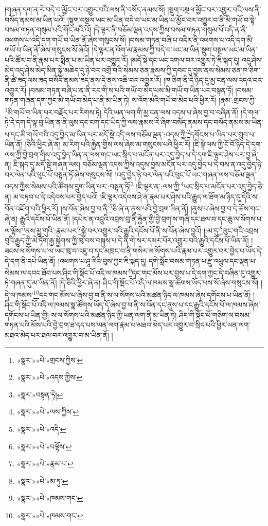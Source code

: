 །གཞན་དག་ན་རེ་བདེ་བ་མྱོང་བར་འགྱུར་བའི་ལས་ནི་བསོད་ནམས་སོ། །སྡུག་བསྔལ་མྱོང་བར་འགྱུར་བའི་ལས་ནི་བསོད་ནམས་མ་ཡིན་པའོ། །སྡུག་བསྔལ་ཡང་མ་ཡིན་བདེ་བ་ཡང་མ་ཡིན་པ་མྱོང་བར་འགྱུར་བ་ནི་མི་གཡོ་བ་སྟེ་བསམ་གཏན་གསུམ་པའི་གོང་མའི་འོ། །དེ་ལྟར་ནི་བཅོམ་ལྡན་འདས་ཀྱིས་བསམ་གཏན་གསུམ་པོ་འདི་ན་ནི་འཕགས་པ་འདི་དག་གཡོ་བ་ཡིན་ནོ་ཞེས་གསུངས་སོ། །བསམ་གཏན་བཞི་པ་འདིར་ནི་འཕགས་པ་འདི་དག་མི་གཡོ་བ་ཡིན་ནོ་ཞེས་གསུངས་སོ་ཞེའོ། །དེ་ལྟར་ན་འོག་མ་རྣམས་ཀྱི་བདེ་བ་ཡང་མ་ཡིན་སྡུག་བསྔལ་ཡང་མ་ཡིན་པའི་ཚོར་བ་ནི་རྣམ་པར་སྨིན་པ་མ་ཡིན་པར་འགྱུར་རོ། །མདོ་སྡེ་དང་ཡང་འགལ་བར་འགྱུར་ཏེ་ཇི་སྐད་དུ། འདུ་ཤེས་མེད་འདུ་ཤེས་མེད་མིན་སྐྱེ་མཆེད་དུ་ཉེ་བར་འགྲོ་བའི་སེམས་ཅན་རྣམས་ཀྱི་དབང་དུ་བྱས་ནས་སེམས་ཅན་ཁ་ཅིག་ནི་ཚེ་ཟད་ལས་ཟད་བསོད་ནམས་ཟད་ནས་དེ་ནས་འཆི་བར་འགྱུར་རོ། །ཁ་ཅིག་ནི་དེ་ཉིད་དུ་མྱ་ངན་ལས་འདའ་བར་འགྱུར་རོ། །བསམ་གཏན་བཞི་པ་ན་ནི་རང་གི་ས་པའི་གཡོ་བ་མེད་པས་མི་གཡོ་བ་ཡིན་པར་བསྟན་ཏོ། །བསམ་གཏན་གཞན་དག་ཀྱང་མི་གཡོ་བ་མེད་པ་ནི་མ་ཡིན་ཏེ། ས་འོག་མའི་གཡོ་བ་མེད་པའི་ཕྱིར་རོ། །རྣམ་:གྲངས་ཀྱི་\footnote{«སྣར་»«པེ་»གྲངས་ཀྱིས་}མི་གཡོ་བ་ཡིན་པར་བརྗོད་པར་རིགས་ཏེ། དེའི་ཡན་ལག་གི་མྱ་ངན་ལས་འདས་པ་ཞེས་བྱ་བ་བཞིན་ནོ། །དེ་གལ་ཏེ་དེ་དག་དེ་ལྟ་བུ་ཡིན་ན་ནི་ལུས་དང་ངག་དང་ཡིད་ཀྱི་ལས་རྣམས་རེ་ཞིག་བསོད་ནམས་དང་བསོད་ནམས་མ་ཡིན་པ་དང་མི་གཡོ་བའི་འདུ་བྱེད་མ་ཡིན་པར་མདོ་སྡེ་འདི་ལས་བཅོམ་ལྡན་:འདས་ཀྱི་\footnote{«སྣར་»«པེ་»འདས་ཀྱིས་}དགོངས་པ་ཡིན་པར་གྲུབ་པ་ཡིན་ནོ། །ཅིའི་ཕྱིར་ཞེ་ན། མ་རིག་པའི་རྐྱེན་གྱིས་ལས་ཞེས་མ་གསུངས་པའི་ཕྱིར་རོ། །ཇི་སྟེ་ལས་ཀྱི་ངོ་བོ་ཉིད་དེ་དག་ལས་ཀྱི་བྱེ་བྲག་གིས་འདུ་བྱེད་ཡིན་ན་ལས་གང་ཡང་སྲིད་པ་མངོན་པར་འདུ་བྱེད་པ་དེ་དག་ཇི་ལྟར་ཤེས་པར་བྱ་ཞེ་ན། ཇི་སྐད་དུ་མདོ་སྡེ་གཞན་ལས། བཅོམ་ལྡན་འདས་ཀྱིས་འདུས་བྱས་མངོན་པར་འདུ་བྱེད་པ་དེ་བས་ན་འདུ་བྱེད་ཉེ་བར་ལེན་པའི་ཕུང་པོ་བསྟན་ཏོ་ཞེས་གསུངས་སོ། །འདུ་བྱེད་ཉེ་བར་ལེན་པའི་ཕུང་པོ་ཡང་གཞན་ལས་བཅོམ་ལྡན་འདས་ཀྱིས་སེམས་པའི་ཚོགས་དྲུག་ཡིན་པར་:བསྟན་ཏོ།\footnote{«སྣར་»བསྟན་ཏེ།} །ཇི་ལྟར་ན་:ལས་ཀྱི་\footnote{«སྣར་»«པེ་»ལས་ཀྱིས་}ཡང་སྲིད་པ་མངོན་པར་འདུ་བྱེད་ཅེ་ན། མ་བཏབ་པ་དེ་འདེབས་པར་བྱེད་པའོ། །ཇི་ལྟར་འདེབས་ཤེ་ན་རྣམ་པར་ཤེས་པའི་རྒྱུད་ལ་ཐོག་མ་ཉིད་དུ་དེའི་ས་བོན་འཇོག་པའི་ཕྱིར་རོ། །ས་བོན་ཞེས་བྱ་བ་ནི་\footnote{«སྣར་»«པེ་»འདི་}ཅི་ཞེ་ན་ནུས་པའི་བྱེ་བྲག་ཡིན་ནོ། །ནུས་པ་ཞེས་བྱ་བ་དེ་ཆོས་གང་ཞེ་ན། རྒྱུའི་དངོས་པོ་ཡིན་ནོ། །དཔེར་ན་འབྲུའི་འབྲས་བུ་ནི་རྐྱེན་གྱི་བྱེ་བྲག་ས་གཞི་དང་ཐལ་བ་དང་ཆུ་ལ་སོགས་པ་ལ་ལྟོས་\footnote{«སྣར་»«པེ་»བལྟོས་}ནས་མྱུ་གུའི་:རྣམ་པར་\footnote{«སྣར་»«པེ་»རྣམ་པ་}སྐྱེ་བར་འགྱུར་བའི་རྒྱུའི་དངོས་པོ་ནི་ས་བོན་ཞེས་བྱའོ། །:མ་དུ་\footnote{«སྣར་»«པེ་»མ་ཏུ་}ལུང་གའི་འབྲས་བུའི་རྒྱུད་ཀྱི་མེ་ཏོག་རྒྱ་སྐྱེགས་ཀྱི་ཁུ་བས་བསྐུས་པ་དེ་ནི་གེ་སར་དམར་པོར་འགྱུར་བའི་རྒྱུའི་དངོས་པོ་ཡིན་ནོ། །ཟངས་ལ་སོགས་པ་ལ་ཡང་ཁུ་བ་འཇུ་བ་དང་མཁྲང་བ་ནི་གསེར་ལ་སོགས་པའི་རྣམ་པར་འགྱུར་བར་བྱེད་པ་ཡོད་དེ་དེ་དག་ནི་དཔེ་ཡིན་ནོ། །འཕགས་པ་ཤཱ་རིའི་བུས་ཀྱང་ཇི་སྐད་དུ། དགེ་སློང་བསམ་གཏན་པ་རྫུ་འཕྲུལ་དང་ལྡན་པ་སེམས་ལ་དབང་ཐོབ་པས་ཤིང་གི་སྡོང་པོ་འདི་ལ་ཁམས་\footnote{«སྣར་»«པེ་»ཁམས་གང་}དང་གང་མོས་པར་བྱས་པ་དེ་དག་ཀྱང་དེ་བཞིན་དུ་འགྱུར་ཏེ་གཞན་དུ་མ་ཡིན་ནོ། །དེ་ཅིའི་ཕྱིར་ཞེ་ན། ཤིང་གི་སྡོང་པོ་འདི་ལ་ཁམས་སྣ་ཚོགས་ཡོད་པས་སོ་ཞེས་གསུངས་སོ། །དེ་ལ་ཁམས་\footnote{«སྣར་»«པེ་»ཁམས་གང་}དང་གང་མོས་པ་ཞེས་བྱ་བ་ནི་ས་ལ་སོགས་པའི་མཚན་ཉིད་ལ་ཁམས་ཞེས་དགོངས་པ་ཡིན་ནོ། །ཤིང་གི་སྡོང་པོ་འདི་ལ་ཁམས་སྣ་ཚོགས་ཡོད་དོ་ཞེས་བྱ་བ་ནི་ས་བོན་དང་ནུས་པ་དང་རྒྱུའི་དངོས་པོ་ལ་ཁམས་ཞེས་དགོངས་པ་ཡིན་གྱི། ས་ལ་སོགས་པའི་མཚན་ཉིད་ཀྱི་ཡན་ལག་ནི་མ་ཡིན་ཏེ། ཤིང་གི་སྡོང་པོ་གཅིག་ལ་བསམ་གཏན་པའི་མོས་པའི་བྱེ་བྲག་ཐ་དད་པས་ཡན་ལག་རྣམ་པ་མཐའ་མེད་པར་འགྱུར་བ་སྲིད་པའི་ཕྱིར་ཡན་ལག་མཐའ་མེད་པར་ཐལ་བར་འགྱུར་བ་མ་ཡིན་ནོ། །
